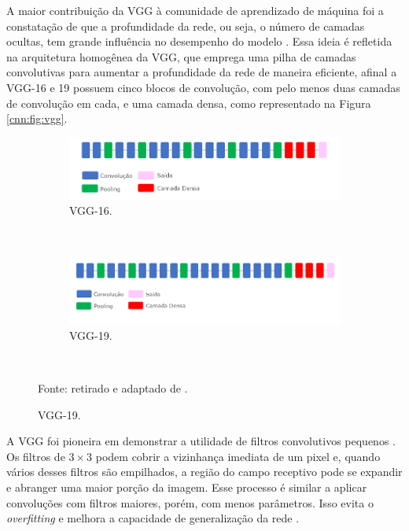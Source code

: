 A maior contribuição da VGG à comunidade de aprendizado de máquina foi a constatação de que a profundidade da rede, ou seja, o número de camadas ocultas, tem grande influência no desempenho do modelo \citep{Simonyan2015}. Essa ideia é refletida na arquitetura homogênea da VGG, que emprega uma pilha de camadas convolutivas para aumentar a profundidade da rede de maneira eficiente, afinal a VGG-16 e 19 possuem cinco blocos de convolução, com pelo menos duas camadas de convolução em cada, e uma camada densa, como representado na Figura \ref{cnn:fig:vgg}.


\begin{figure}[H]
   \caption{Representação de VGGs.}
   \centering
   \label{cnn:fig:vgg}
    \begin{subfigure}[t]{0.8\textwidth}
        \centering
        \includegraphics[width=1\linewidth]{recursos/imagens/deep/vgg16.png}
        \caption{VGG-16.}
        \label{cnn:fig:vgg.1}
    \end{subfigure}%
    ~ 

    \begin{subfigure}[t]{0.8\textwidth}
        \centering
        \includegraphics[width=1\linewidth]{recursos/imagens/deep/vgg19.png}
        \caption{VGG-19.}
        \label{cnn:fig:vgg.2}
    \end{subfigure}%
    ~

    Fonte: retirado e adaptado de \cite{Mahdianpari2018VeryImagery}.
\end{figure}

A VGG foi pioneira em demonstrar a utilidade de filtros convolutivos pequenos \citep{Simonyan2015}. Os filtros de $3 \times 3$ podem cobrir a vizinhança imediata de um pixel e, quando vários desses filtros são empilhados, a região do campo receptivo pode se expandir e abranger uma maior porção da imagem. Esse processo é similar a aplicar convoluções com filtros maiores, porém, com menos parâmetros. Isso evita o \textit{overfitting} e melhora a capacidade de generalização da rede \citep{Simonyan2015}.

